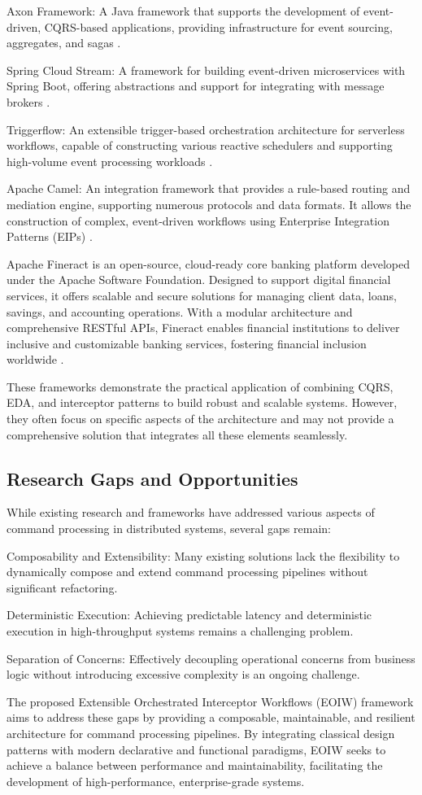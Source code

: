 Axon Framework: A Java framework that supports the development of event-driven, CQRS-based applications, providing infrastructure for event sourcing, aggregates, and sagas .

Spring Cloud Stream: A framework for building event-driven microservices with Spring Boot, offering abstractions and support for integrating with message brokers .

Triggerflow: An extensible trigger-based orchestration architecture for serverless workflows, capable of constructing various reactive schedulers and supporting high-volume event processing workloads .

Apache Camel: An integration framework that provides a rule-based routing and mediation engine, supporting numerous protocols and data formats. It allows the construction of complex, event-driven workflows using Enterprise Integration Patterns (EIPs) .

Apache Fineract is an open-source, cloud-ready core banking platform developed under the Apache Software Foundation. Designed to support digital financial services, it offers scalable and secure solutions for managing client data, loans, savings, and accounting operations. With a modular architecture and comprehensive RESTful APIs, Fineract enables financial institutions to deliver inclusive and customizable banking services, fostering financial inclusion worldwide .

These frameworks demonstrate the practical application of combining CQRS, EDA, and interceptor patterns to build robust and scalable systems. However, they often focus on specific aspects of the architecture and may not provide a comprehensive solution that integrates all these elements seamlessly.

\subsection{Research Gaps and Opportunities}
While existing research and frameworks have addressed various aspects of command processing in distributed systems, several gaps remain:

Composability and Extensibility: Many existing solutions lack the flexibility to dynamically compose and extend command processing pipelines without significant refactoring.

Deterministic Execution: Achieving predictable latency and deterministic execution in high-throughput systems remains a challenging problem.

Separation of Concerns: Effectively decoupling operational concerns from business logic without introducing excessive complexity is an ongoing challenge.

The proposed Extensible Orchestrated Interceptor Workflows (EOIW) framework aims to address these gaps by providing a composable, maintainable, and resilient architecture for command processing pipelines. By integrating classical design patterns with modern declarative and functional paradigms, EOIW seeks to achieve a balance between performance and maintainability, facilitating the development of high-performance, enterprise-grade systems.